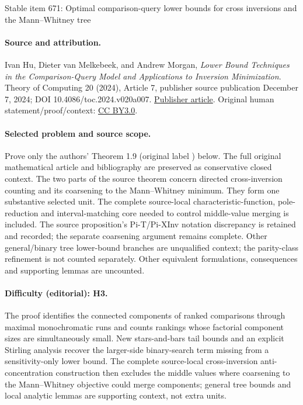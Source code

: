 \documentclass[11pt]{article}
\numberwithin{equation}{section}
\theoremstyle{definition}
\theoremstyle{plain}
\begin{document}
\begin{center}{\Large Stable item 671: Optimal comparison-query lower bounds for cross inversions and the Mann–Whitney tree}\end{center}
\paragraph{Source and attribution.}
Ivan Hu, Dieter van Melkebeek, and Andrew Morgan, \emph{Lower Bound Techniques in the Comparison-Query Model and Applications to Inversion Minimization}. Theory of Computing 20 (2024), Article 7, publisher source publication December 7, 2024; DOI 10.4086/toc.2024.v020a007. \href{https://theoryofcomputing.org/articles/v020a007/}{Publisher article}. Original human statement/proof/context: \href{https://creativecommons.org/licenses/by/3.0/}{CC BY3.0}.
\paragraph{Selected problem and source scope.}
Prove only the authors' Theorem 1.9 (original label ) below. The full original mathematical article and bibliography are preserved as conservative closed context. The two parts of the source theorem concern directed cross-inversion counting and its coarsening to the Mann--Whitney minimum. They form one substantive selected unit. The complete source-local characteristic-function, pole-reduction and interval-matching core needed to control middle-value merging is included. The source proposition's Pi-T/Pi-XInv notation discrepancy is retained and recorded; the separate coarsening argument remains complete. Other general/binary tree lower-bound branches are unqualified context; the parity-class refinement is not counted separately. Other equivalent formulations, consequences and supporting lemmas are uncounted.
\paragraph{Difficulty (editorial): H3.}
The proof identifies the connected components of ranked comparisons through maximal monochromatic runs and counts rankings whose factorial component sizes are simultaneously small. New stars-and-bars tail bounds and an explicit Stirling analysis recover the larger-side binary-search term missing from a sensitivity-only lower bound. The complete source-local cross-inversion anti-concentration construction then excludes the middle values where coarsening to the Mann–Whitney objective could merge components; general tree bounds and local analytic lemmas are supporting context, not extra units.
\end{document}
